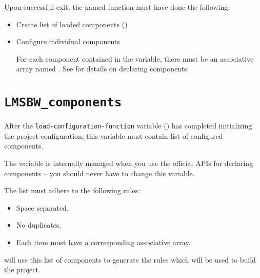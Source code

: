 Upon successful exit, the named function must have done the following:

\begin{itemize}
\item Create list of loaded components
  ()

\item Configure individual components

  For each component contained in the \lmsbwcomponents variable, there
  must be an associative array named .
  See  for details on declaring components.

\end{itemize}


\section{\texttt{LMSBW\_components}}\label{variables:lmsbw-components}

After the \texttt{load-configuration-function} variable
() has completed
initializing the project configuration, this variable must contain list
of configured components.

The variable is internally managed when you use the official APIs for
declaring components -- you should never have to change this variable.

The list must adhere to the following rules:

\begin{itemize}
\item Space separated.
\item No duplicates.
\item Each item must have a corresponding 
  associative array.
\end{itemize}

\lmsbw will use this list of components to generate the rules which
will be used to build the project.

\section{}\label{variables:lmsbw-component-component}

